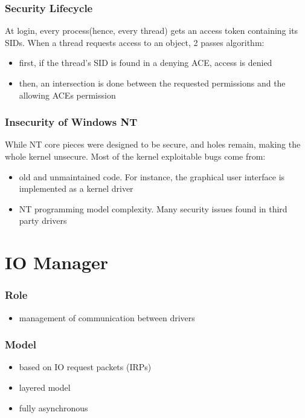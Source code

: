 
\begin{frame}
  \frametitle{Security Lifecycle}

  At login, every process(hence, every thread) gets an access token containing its SIDs.
  When a thread requests access to an object, 2 passes algorithm:

  \begin{itemize}
    \item
      first, if the thread's SID is found in a denying ACE, access is denied
    \item
      then, an intersection is done between the requested permissions and the allowing ACEs permission
  \end{itemize}
\end{frame}


\begin{frame}
  \frametitle{Insecurity of Windows NT}

  While NT core pieces were designed to be secure,  and 
  holes remain, making the whole kernel unsecure. Most of the kernel exploitable bugs come from:

  \begin{itemize}
    \item
      old and unmaintained code. For instance, the graphical user interface is implemented as a kernel driver
    \item
      NT programming model complexity. Many security issues found in third party drivers
  \end{itemize}

\end{frame}


%
%

\section{IO Manager}


\begin{frame}
 \frametitle{Role}
 \begin{itemize}
  \item
    management of communication between drivers
 \end{itemize}
\end{frame}


\begin{frame}
 \frametitle{Model}
 \begin{itemize}
  \item
    based on IO request packets (IRPs)
  \item
    layered model
  \item
    fully asynchronous
 \end{itemize}
\end{frame}

